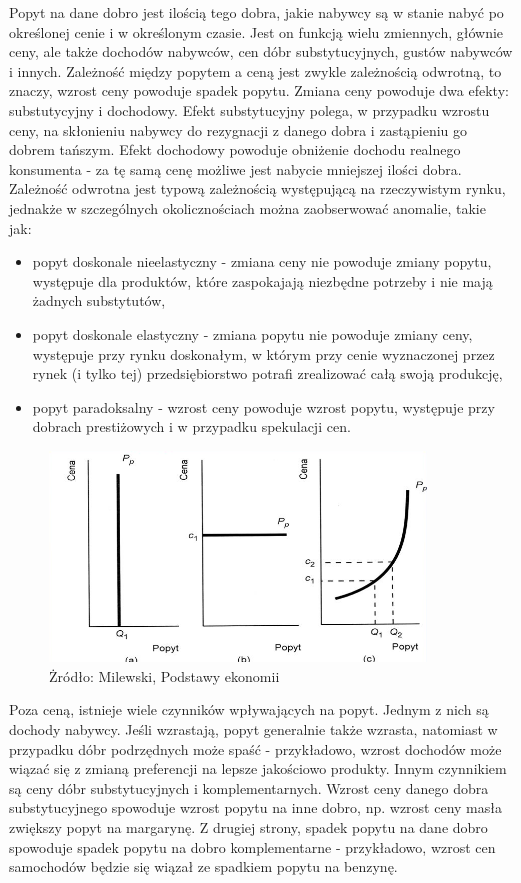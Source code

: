 \documentclass[12pt]{extarticle}
\begin{document}
Popyt na dane dobro jest ilością tego dobra, jakie nabywcy są w stanie nabyć po określonej cenie i w określonym czasie. Jest on funkcją wielu zmiennych, głównie ceny, ale także dochodów nabywców, cen dóbr substytucyjnych, gustów nabywców i innych. Zależność między popytem a ceną jest zwykle zależnością odwrotną, to znaczy, wzrost ceny powoduje spadek popytu. Zmiana ceny powoduje dwa efekty: substutycyjny i dochodowy. Efekt substytucyjny polega, w przypadku wzrostu ceny, na skłonieniu nabywcy do rezygnacji z danego dobra i zastąpieniu go dobrem tańszym. Efekt dochodowy powoduje obniżenie dochodu realnego konsumenta - za tę samą cenę możliwe jest nabycie mniejszej ilości dobra. Zależność odwrotna jest typową zależnością występującą na rzeczywistym rynku, jednakże w szczególnych okolicznościach można zaobserwować anomalie, takie jak:

\begin{itemize}
	\item popyt doskonale nieelastyczny - zmiana ceny nie powoduje zmiany popytu, występuje dla produktów, które zaspokajają niezbędne potrzeby i nie mają żadnych substytutów,
    \item popyt doskonale elastyczny - zmiana popytu nie powoduje zmiany ceny, występuje przy rynku doskonałym, w którym przy cenie wyznaczonej przez rynek (i tylko tej) przedsiębiorstwo potrafi zrealizować całą swoją produkcję,
    \item popyt paradoksalny - wzrost ceny powoduje wzrost popytu, występuje przy dobrach prestiżowych i w przypadku spekulacji cen.
\end{itemize}

\begin{figure}[H]
\centering
\includegraphics[width=10cm]{popyt_nietypowy}
    \caption{Żródło: Milewski, Podstawy ekonomii}
\end{figure}


Poza ceną, istnieje wiele czynników wpływających na popyt. Jednym z nich są dochody nabywcy. Jeśli wzrastają, popyt generalnie także wzrasta, natomiast w przypadku dóbr podrzędnych może spaść - przykładowo, wzrost dochodów może wiązać się z zmianą preferencji na lepsze jakościowo produkty. Innym czynnikiem są ceny dóbr substytucyjnych i komplementarnych. Wzrost ceny danego dobra substytucyjnego spowoduje wzrost popytu na inne dobro, np. wzrost ceny masła zwiększy popyt na margarynę. Z drugiej strony, spadek popytu na dane dobro spowoduje spadek popytu na dobro komplementarne - przykładowo, wzrost cen samochodów będzie się wiązał ze spadkiem popytu na benzynę.
\end{document}
